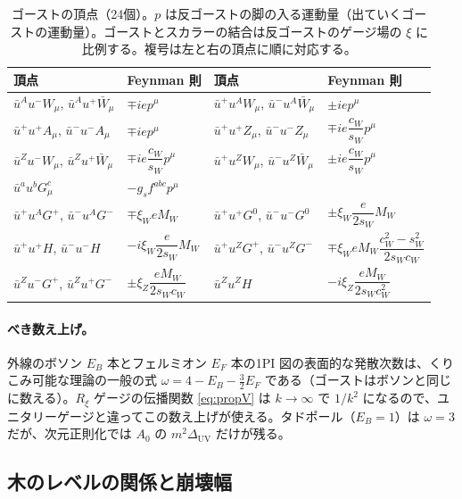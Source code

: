 \documentclass[a4paper,10pt]{ltjsarticle}
\newcommand{\DUV}{\Delta_{\mathrm{UV}}}
\newcommand{\sw}{s_W}
\newcommand{\cw}{c_W}
\begin{document}
\begin{table}[tbp]
\centering\small\renewcommand{\arraystretch}{1.75}
\caption{ゴーストの頂点（24個）。$p$ は反ゴーストの脚の入る運動量（出ていくゴーストの運動量）。ゴーストとスカラーの結合は反ゴーストのゲージ場の $\xi$ に比例する。複号は左と右の頂点に順に対応する。}
\label{tab:rules-gh}
\begin{tabular}{llll}
\toprule
頂点 & Feynman 則 & 頂点 & Feynman 則 \\
\midrule
$\bar u^Au^-W_\mu$, $\bar u^Au^+\bar W_\mu$ & $\mp iep^\mu$ & $\bar u^+u^AW_\mu$, $\bar u^-u^A\bar W_\mu$ & $\pm iep^\mu$ \\
$\bar u^+u^+A_\mu$, $\bar u^-u^-A_\mu$ & $\mp iep^\mu$ & $\bar u^+u^+Z_\mu$, $\bar u^-u^-Z_\mu$ & $\mp ie\dfrac{\cw}{\sw}p^\mu$ \\
$\bar u^Zu^-W_\mu$, $\bar u^Zu^+\bar W_\mu$ & $\mp ie\dfrac{\cw}{\sw}p^\mu$ & $\bar u^+u^ZW_\mu$, $\bar u^-u^Z\bar W_\mu$ & $\pm ie\dfrac{\cw}{\sw}p^\mu$ \\
$\bar u^au^bG^c_\mu$ & $-g_sf^{abc}p^\mu$ & & \\
\midrule
$\bar u^+u^AG^+$, $\bar u^-u^AG^-$ & $\mp\xi_WeM_W$ & $\bar u^+u^+G^0$, $\bar u^-u^-G^0$ & $\pm\xi_W\dfrac{e}{2\sw}M_W$ \\
$\bar u^+u^+H$, $\bar u^-u^-H$ & $-i\xi_W\dfrac{e}{2\sw}M_W$ & $\bar u^+u^ZG^+$, $\bar u^-u^ZG^-$ & $\mp\xi_WeM_W\dfrac{\cw^2-\sw^2}{2\sw\cw}$ \\
$\bar u^Zu^-G^+$, $\bar u^Zu^+G^-$ & $\pm\xi_Z\dfrac{eM_W}{2\sw\cw}$ & $\bar u^Zu^ZH$ & $-i\xi_Z\dfrac{eM_W}{2\sw\cw^2}$ \\
\bottomrule
\end{tabular}
\end{table}

\paragraph{べき数え上げ。}外線のボソン $E_B$ 本とフェルミオン $E_F$ 本の1PI 図の表面的な発散次数は、くりこみ可能な理論の一般の式 $\omega=4-E_B-\frac32E_F$ である（ゴーストはボソンと同じに数える）。$R_\xi$ ゲージの伝播関数 \eqref{eq:propV} は $k\to\infty$ で $1/k^2$ になるので、ユニタリーゲージと違ってこの数え上げが使える。タドポール（$E_B=1$）は $\omega=3$ だが、次元正則化では $A_0$ の $m^2\DUV$ だけが残る。

\subsection{木のレベルの関係と崩壊幅}\label{sec:tree}
\end{document}
